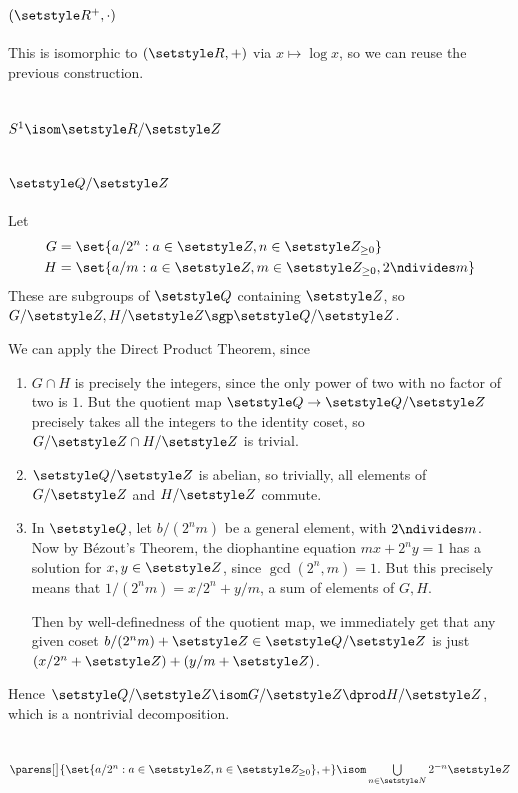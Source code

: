 \documentclass[fleqn,a4paper,11pt]{article}
\begin{document}
\section{\((\R^+, \cdot)\)}

This is isomorphic to \((\R, +)\) via \(x \mapsto \log x\), so we can reuse the
previous construction.

\section{\(S^1 \isom \R / \Z\)}

\section{\(\Q / \Z\)}

Let
\begin{align*}
 G &= \set{a/2^n : a \in \Z, n \in \Z_{\ge 0}} \\
 H &= \set{a/m : a \in \Z, m \in \Z_{\ge 0}, 2 \ndivides m}
\end{align*}
These are subgroups of \(\Q\) containing \(\Z\), so
\(G / \Z, H / \Z \sgp \Q / \Z\).

We can apply the Direct Product Theorem, since
\begin{enumerate}[label=(\roman*)]
 \item
  \(G \cap H\) is precisely the integers, since the only power of two with no
  factor of two is \(1\). But the quotient map \(\Q \to \Q/\Z\) precisely takes
  all the integers to the identity coset, so \(G/\Z \cap H/\Z\) is trivial.
 \item
  \(\Q/\Z\) is abelian, so trivially, all elements of \(G/\Z\) and \(H/\Z\)
  commute.
 \item
  In \(\Q\), let \(b/(2^n m)\) be a general element, with \(2 \ndivides m\). Now
  by B\'ezout's Theorem, the diophantine equation  \(mx + 2^n y = 1\) has a
  solution for \(x, y \in \Z\), since \(\gcd(2^n, m) = 1\). But this precisely
  means that \(1/(2^n m) = x/2^n + y/m\), a sum of elements of \(G, H\).

  Then by well-definedness of the quotient map, we immediately get that any
  given coset \(b/(2^n m) + \Z \in \Q / \Z\) is just
  \((x/2^n + \Z) + (y/m + \Z)\).
\end{enumerate}
Hence \(\Q/\Z \isom G/\Z \dprod H/\Z\), which is a nontrivial decomposition.

\section{\(\parens[\big]{\set{a / 2^n : a \in \Z, n \in \Z_{\ge 0}}, +}
           \isom \bigcup\limits_{n \in \N} 2^{-n} \Z \)}
\end{document}
